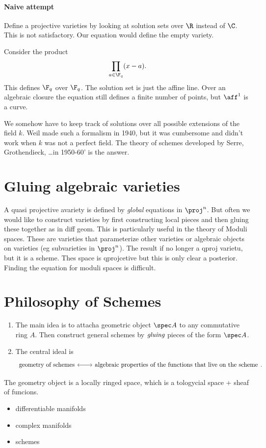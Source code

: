 \paragraph{Naive attempt}
Define a projective varieties by looking at solution sets over $\R$ instead of $\C$. 
This is not satisfactory. Our equation would define the empty variety. 
\begin{example}
	Consider the product \[
		\prod_{a \in \F_q} (x - a)
	.\] 
	This defines $\F_q$ over $\F_q$. The solution set is just the affine line. 
	Over an algebraic closure the equation still defines a finite number of points, but  $\aff^{1}$ is a curve.
\end{example}
We somehow have to keep track of solutions over all possible extensions of the field $k$. 
Weil made such a formalism in 1940, but it was cumbersome and didn't work when $k$ was not a perfect field.
The theory of schemes developed by Serre, Grothendieck, \ldots in 1950-60' is the answer.

\section{Gluing algebraic varieties} \label{sec:gluing_algebraic_varieties}
A quasi projective avariety is defined by \emph{global} equations in $\proj^{n}$. 
But often we would like to construct varieties by first constructing local pieces and then gluing these together as in diff geom.
This is particularly useful in the theory of Moduli spaces. These are varieties that parameterize other varieties or algebraic objects on varieties (eg subvarieties in $\proj^{n}$).
The result if no longer a qproj varietu, but it is a scheme.
Thes space is qprojcetive but this is only clear a posterior. Finding the equation for moduli spaces is difficult.

\section{Philosophy of Schemes} \label{sec:philosophy_of_schemes}
\begin{enumerate}
	\item The main idea is to attacha geometric object $\spec A$ to any commutative ring $A$. 
Then construct general schemes by $\emph{gluing}$ pieces of the form $\spec A$. 
\item The central ideal is 
	\[
	\begin{tikzcd}
		\text{geometry of schemes} \arrow[r, leftrightarrow] & \text{algebraic properties of the functions that live on the scheme}
	\end{tikzcd}
	.\] 

\end{enumerate}
The geometry object is a locally ringed space, which is a tologycial space + sheaf of funcions. 
\begin{example}
	\begin{itemize}
		\item differentiable manifolds
		\item complex manifolds
		\item schemes
	\end{itemize}
\end{example}

